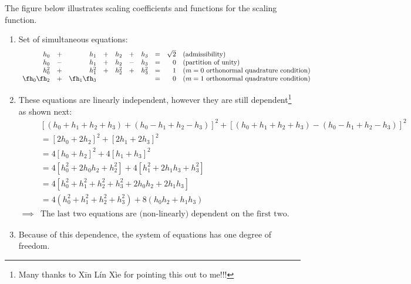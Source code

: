 \begin{example}
\label{ex:sw_gh_d2}
The figure below illustrates scaling coefficients and functions
for the  scaling function.
\begin{enumerate}
\item Set of simultaneous equations:
\[\begin{array}{*{9}{r}l}
  h_0      &+& h_1      &+& h_2   &+& h_3   &=& \sqrt{2}      
  &\text{(admissibility)} 
  \\
  h_0      &-& h_1      &+& h_2   &-& h_3   &=& 0          
  &\text{(partition of unity)} 
  \\
  h_0^2    &+& h_1^2    &+& h_2^2 &+& h_3^2 &=& 1                  
  &\text{($m=0$ orthonormal quadrature condition)} 
  \\
  \fh_0\fh_2 &+& \fh_1\fh_3 & &         & &         &=& 0
  &\text{($m=1$ orthonormal quadrature condition)} 
\end{array}\]

\item These equations are linearly independent, however they are 
      still dependent\footnote{
        Many thanks to X\=in L\'in X\`ie for pointing this out to me!!!
        }
      as shown next:
  \begin{align*}
    &  [(h_0+h_1+h_2+h_3)+(h_0-h_1+h_2-h_3)]^2+[(h_0+h_1+h_2+h_3)-(h_0-h_1+h_2-h_3)]^2
  \\&= [2h_0+2h_2]^2+[2h_1+2h_3]^2
  \\&= 4[h_0+h_2]^2+4[h_1+h_3]^2
  \\&= 4[h_0^2+2h_0h_2+h_2^2]+4[h_1^2+2h_1h_3+h_3^2]
  \\&= 4[h_0^2 + h_1^2 + h_2^2 + h_3^2 + 2h_0h_2 + 2h_1h_3]
  \\&= 4(h_0^2 + h_1^2 + h_2^2 + h_3^2) + 8(h_0h_2 + h_1h_3)
  \\ \implies & \text{The last two equations are (non-linearly) dependent on the first two.}
  \end{align*}

\item Because of this dependence, the system of equations has one degree of freedom.


\end{enumerate}
\end{example}
